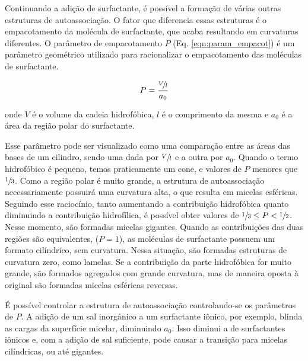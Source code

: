	
	Continuando a adição de surfactante, é possível a formação de várias outras estruturas de autoassociação. O fator que diferencia essas estruturas é o empacotamento da molécula de surfactante, que acaba resultando em curvaturas diferentes. O parâmetro de empacotamento \(P\) (Eq. \ref{eqn:param_empacot}) é um parâmetro geométrico utilizado para racionalizar o empacotamento das moléculas de surfactante.
	
	\begin{equation}
		P = \dfrac{\sfrac{V\!}{l}}{a_0}
		\label{eqn:param_empacot}
	\end{equation}
	
	\noindent onde \(V\) é o volume da cadeia hidrofóbica, \(l\) é o comprimento da mesma e \(a_0\) é a área da região polar do surfactante.
	
	Esse parâmetro pode ser visualizado como uma comparação entre as áreas das bases de um cilindro, sendo uma dada por \(\sfrac{V}{l}\) e a outra por \(a_0\). Quando o termo hidrofóbico é pequeno, temos praticamente um cone, e valores de \(P\) menores que \(\sfrac{1}{3}\). Como a região polar é muito grande, a estrutura de autoassociação necessariamente possuirá uma curvatura alta, o que resulta em micelas esféricas. Seguindo esse raciocínio, tanto aumentando a contribuição hidrofóbica quanto diminuindo a contribuição hidrofílica, é possível obter valores de \(\sfrac{1}{3} \leq P < \sfrac{1}{2}\). Nesse momento, são formadas micelas gigantes. Quando as contribuições das duas regiões são equivalentes, (\(P = 1\)), as moléculas de surfactante possuem um formato cilíndrico, sem curvatura. Nessa situação, são formadas estruturas de curvatura zero, como lamelas. Se a contribuição da parte hidrofóbica for muito grande, são formados agregados com grande curvatura, mas de maneira oposta à original são formadas micelas esféricas reversas.
	
	
	É possível controlar a estrutura de autoassociação controlando-se os parâmetros de \(P\). A adição de um sal inorgânico a um surfactante iônico, por exemplo, blinda as cargas da superfície micelar, diminuindo \(a_0\). Isso diminui a \cmc{} de surfactantes iônicos e, com a adição de sal suficiente, pode causar a transição para micelas cilíndricas, ou até gigantes.
	

